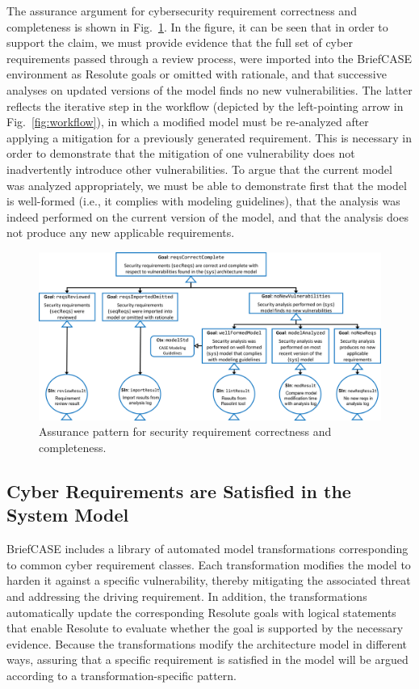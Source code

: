 The assurance argument for cybersecurity requirement correctness and completeness is shown in Fig.~\ref{fig:req-correct-complete}.  
In the figure, it can be seen that in order to support the claim, we must provide evidence that the full set of cyber requirements passed through a review process, were imported into the BriefCASE environment as Resolute goals or omitted with rationale, and that successive analyses on updated versions of the model finds no new vulnerabilities.  The latter reflects the iterative step in the workflow (depicted by the left-pointing arrow in Fig.~\ref{fig:workflow}), in which a modified model must be re-analyzed after applying a mitigation for a previously generated requirement.  This is necessary in order to demonstrate that the mitigation of one vulnerability does not inadvertently introduce other vulnerabilities.  To argue that the current model was analyzed appropriately, we must be able to demonstrate first that the model is well-formed (i.e., it complies with modeling guidelines), that the analysis was indeed performed on the current version of the model, and that the analysis does not produce any new applicable requirements.

\begin{figure}[h] 
	\centering 
	\includegraphics[width=\textwidth]{figs/req-correct-complete.png}
	\caption{Assurance pattern for security requirement correctness and completeness.}
	\label{fig:req-correct-complete} 
\end{figure}
\vspace{-3mm}

\subsection{Cyber Requirements are Satisfied in the System Model}
\label{sec:requirements-satisfied-in-model}
BriefCASE includes a library of automated model transformations corresponding to common cyber requirement classes.  Each transformation modifies the model to harden it against a specific vulnerability, thereby mitigating the associated threat and addressing the driving requirement.  In addition, the transformations automatically update the corresponding Resolute goals with logical statements that enable Resolute to evaluate whether the goal is supported by the necessary evidence.
%
Because the transformations modify the architecture model in different ways, assuring that a specific requirement is satisfied in the model will be argued according to a transformation-specific pattern.  

